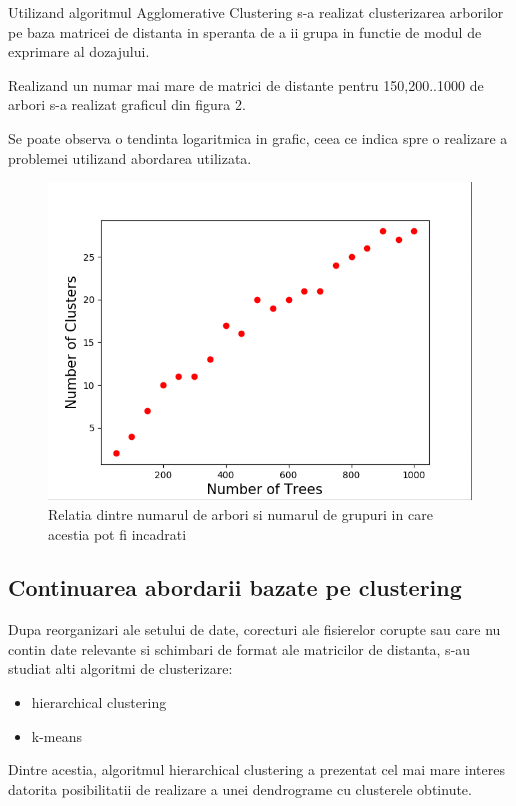 \documentclass[a4paper,12pt]{article}
\begin{document}
Utilizand algoritmul Agglomerative Clustering s-a realizat clusterizarea arborilor pe baza matricei de distanta in speranta de a ii grupa in functie de modul de exprimare al dozajului.

Realizand un numar mai mare de matrici de distante pentru 150,200..1000 de arbori s-a realizat graficul din figura 2.

Se poate observa o tendinta logaritmica in grafic, ceea ce indica spre o realizare a problemei utilizand abordarea utilizata.

\begin{figure}[h]
 \includegraphics[width=12cm]{Result.png}
 \caption{Relatia dintre numarul de arbori si numarul de grupuri in care acestia pot fi incadrati}
 \end{figure}
 
 
\subsection{Continuarea abordarii bazate pe clustering}

Dupa reorganizari ale setului de date, corecturi ale fisierelor corupte sau care nu contin date relevante si schimbari de format ale matricilor de distanta, s-au studiat alti algoritmi de clusterizare:
\begin{itemize}
\item hierarchical clustering
\item k-means
\end{itemize}

Dintre acestia, algoritmul hierarchical clustering a prezentat cel mai mare interes datorita posibilitatii de realizare a unei dendrograme cu clusterele obtinute. 
\end{document}
